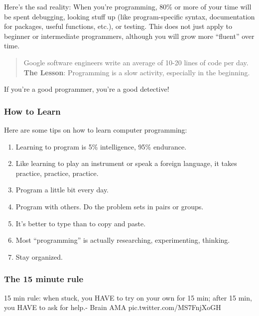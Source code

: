 \documentclass[]{book}
\begin{document}
Here's the sad reality: When you're programming, 80\% or more of your time will be spent debugging, looking stuff up (like program-specific syntax, documentation for packages, useful functions, etc.), or testing. This does not just apply to beginner or intermediate programmers, although you will grow more ``fluent'' over time.

\begin{quote}
Google software engineers write an average of 10-20 lines of code per day.
\textbf{The Lesson}: Programming is a slow activity, especially in the beginning.
\end{quote}

If you're a good programmer, you're a good detective!

\hypertarget{how-to-learn}{%
\subsubsection*{How to Learn}\label{how-to-learn}}

Here are some tips on how to learn computer programming:

\begin{enumerate}
\def\labelenumi{\arabic{enumi}.}
\item
  Learning to program is 5\% intelligence, 95\% endurance.
\item
  Like learning to play an instrument or speak a foreign language, it takes practice, practice, practice.
\item
  Program a little bit every day.
\item
  Program with others. Do the problem sets in pairs or groups.
\item
  It's better to type than to copy and paste.
\item
  Most ``programming'' is actually researching, experimenting, thinking.
\item
  Stay organized.
\end{enumerate}

\hypertarget{the-15-minute-rule}{%
\subsubsection*{The 15 minute rule}\label{the-15-minute-rule}}

15 min rule: when stuck, you HAVE to try on your own for 15 min; after 15 min, you HAVE to ask for help.- Brain AMA pic.twitter.com/MS7FnjXoGH
\end{document}

